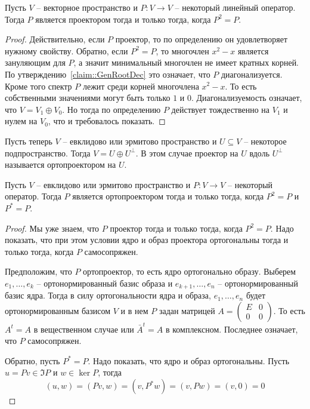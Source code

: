 \begin{claim}
Пусть $V$ -- векторное пространство и $P\colon V\to V$ -- некоторый линейный оператор. Тогда $P$ является проектором тогда и только тогда, когда $P^2 = P$.
\end{claim}
\begin{proof}
Действительно, если $P$ проектор, то по определению он удовлетворяет нужному свойству. Обратно, если $P^2 = P$, то многочлен $x^2 - x$ является зануляющим для $P$, а значит минимальный многочлен не имеет кратных корней. По утверждению~\ref{claim::GenRootDec} это означает, что $P$ диагонализуется. Кроме того спектр $P$ лежит среди корней многочлена $x^2 - x$. То есть собственными значениями могут быть только $1$ и $0$. Диагонализуемость означает, что $V = V_1\oplus V_0$. Но тогда по определению $P$ действует тождественно на $V_1$ и нулем на $V_0$, что и требовалось показать.
\end{proof}

Пусть теперь $V$ -- евклидово или эрмитово пространство и $U\subseteq V$ -- некоторое подпространство. Тогда $V = U\oplus U^\bot$. В этом случае проектор на $U$ вдоль $U^\bot$ называется ортопроектором на $U$.

\begin{claim}
Пусть $V$ -- евклидово или эрмитово пространство и $P\colon V\to V$ -- некоторый оператор. Тогда $P$ является ортопроектором тогда и только тогда, когда $P^2 = P$ и $P^* = P$.
\end{claim}
\begin{proof}
Мы уже знаем, что $P$ проектор тогда и только тогда, когда $P^2 = P$. Надо показать, что при этом условии ядро и образ проектора ортогональны тогда и только тогда, когда $P$ самосопряжен.


Предположим, что $P$ ортопроектор, то есть ядро ортогонально образу. Выберем $e_1,\ldots,e_k$ -- ортонормированный базис образа и $e_{k+1}, \ldots,e_n$ -- ортонормированный базис ядра. Тогда в силу ортогональности ядра и образа, $e_1,\ldots,e_n$ будет ортонормированным базисом $V$ и в нем $P$ задан матрицей $A=\left(\begin{smallmatrix}{E}&{0}\\{0}&{0}\end{smallmatrix}\right)$. То есть $A^t = A$ в вещественном случае или $\bar A^t  = A$ в комплексном. Последнее означает, что $P$ самосопряжен.

Обратно, пусть $P^* = P$. Надо показать, что ядро и образ ортогональны. Пусть $u = Pv\in \Im P$ и $w \in \ker P$, тогда
\[
(u, w) = (Pv, w) = (v, P^*w) = (v, Pw) = (v, 0) = 0
\]
\end{proof}

